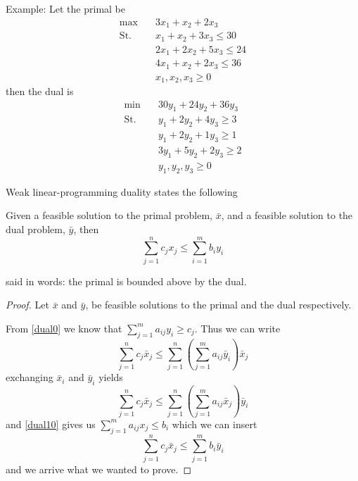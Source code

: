 \documentclass[10pt]{article}
\begin{document}
Example: Let the primal be
\begin{align}
 \max &\quad 3x_1 + x_2 + 2x_3\label{dual1}\\ 
 \text{St.} &\quad  x_1  + x_2  + 3x_3 \leq 30 \nonumber\\
            &\quad  2x_1 + 2x_2 + 5x_3 \leq 24 \nonumber\\
            &\quad  4x_1 + x_2  + 2x_3 \leq 36 \nonumber\\            
            &\quad  x_1,x_2,x_3 \geq 0  \nonumber
\end{align}
then the dual is
\begin{align}
 \min &\quad 30y_1 + 24y_2 + 36y_3 \label{dual2}\\ 
 \text{St.} &\quad  y_1 + 2y_2  + 4y_3  \geq 3 \nonumber\\
            &\quad  y_1 + 2y_2  + 1y_3  \geq 1 \nonumber\\
            &\quad  3y_1 + 5y_2  + 2y_3 \geq 2 \nonumber\\            
            &\quad  y_1, y_2, y_3 \geq 0  \nonumber
\end{align}

Weak linear-programming duality states the following
\begin{theorem}
  Given a feasible solution to the primal problem, $\bar{x}$, and a feasible solution to the dual problem, $\bar{y}$, then
  \begin{equation}
  \sum_{j=1}^n c_jx_j \leq \sum_{i=1}^m b_iy_i
  \end{equation}  
\end{theorem}
said in words: the primal is bounded above by the dual.

\begin{proof}
Let $\bar{x}$ and $\bar{y}$, be feasible solutions to the primal and the dual respectively.

From \ref{dual0} we know that $\sum_{j=1}^m a_{ij}y_i \geq c_j$. Thus we can write
\begin{equation}
\sum_{j=1}^n c_j\bar{x}_j \leq  \sum_{j=1}^n \left (\sum_{j=1}^m a_{ij}\bar{y}_i\right)\bar{x}_j   
\end{equation}
exchanging $\bar{x}_i$ and $\bar{y}_i$ yields
\begin{equation}
\sum_{j=1}^n c_j\bar{x}_j \leq  \sum_{j=1}^n \left (\sum_{j=1}^m a_{ij}\bar{x}_j\right)\bar{y}_i
\end{equation}
and \ref{dual10} gives us $\sum_{j=1}^m a_{ij}x_j \leq b_i$ which we can insert
\begin{equation}
\sum_{j=1}^n c_j\bar{x}_j \leq  \sum_{j=1}^m b_i\bar{y}_i
\end{equation}
and we arrive what we wanted to prove.
\end{proof}
\end{document}
